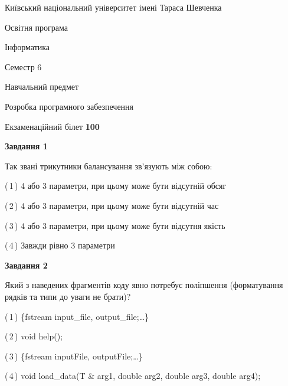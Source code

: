 \documentclass[10pt, ukrainian]{article}
\begin{document}
{{\begin {small}\par
{ \center  Київський національний університет імені Тараса Шевченка \par}
{\parbox {5 cm}{Освітня програма \hfill}{\parbox {7 cm}{Інформатика \hfill}}\parbox {6 cm}{\hfill Семестр 6}}\par
{\parbox {5 cm} {Навчальний предмет \hfill}\parbox {7 cm}{Розробка програмного забезпечення \hfill}\parbox {6cm}{\hfill}\par}\vspace{-7pt} \end{small}}{\center Екзаменаційний білет \No \textbf
{ 100 }\par}}
{
\begin {large}
{\begin {center}\textbf{Завдання 1}\end {center}}\par
Так звані трикутники балансування зв'язують між собою:\par
\vspace{2mm}



(\,1\,) 4 або 3 параметри, при цьому може бути відсутній обсяг %



(\,2\,) 4 або 3 параметри, при цьому може бути відсутній час%



(\,3\,) 4 або 3 параметри, при цьому може бути відсутня якість%



(\,4\,) Завжди рівно 3 параметри%


{\begin {center}\textbf{Завдання 2}\end {center}}\par
Який з наведених фрагментів коду явно потребує поліпшення (форматування рядків та типи до уваги не брати)?\par
\vspace{2mm}



(\,1\,) \{fstream input\_file, output\_file;…\} %



(\,2\,) void help();%



(\,3\,) \{fstream inputFile, outputFile;…\} %



(\,4\,) void load\_data(T \& arg1, double arg2, double arg3, double arg4); %



\end{large}}
\end{document}
